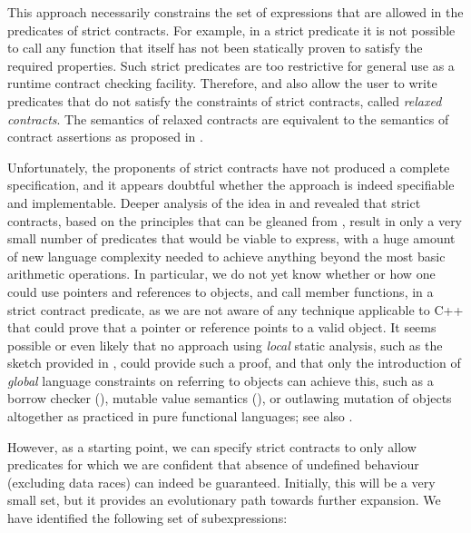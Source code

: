 This approach necessarily  constrains the set of expressions that are allowed in the predicates of strict contracts. For example, in a strict predicate it is not possible to call any function that itself has not been statically proven to satisfy the required properties. Such strict predicates are too restrictive for general use as a runtime contract checking facility. Therefore, \cite{P2680R1} and \cite{P3285R0} also allow the user to write predicates that do not satisfy the constraints of strict contracts, called \emph{relaxed contracts}. The semantics of relaxed contracts are equivalent to the semantics of contract assertions as proposed in \cite{P2900R13}.

Unfortunately, the proponents of strict contracts have not produced a complete specification, and it appears doubtful whether the approach is indeed specifiable and implementable. Deeper analysis of the idea in \cite{P3376R0} and \cite{P3386R0} revealed that strict contracts, based on the principles that can be gleaned from \cite{P3285R0}, result in only a very small number of predicates that would be viable to express, with a huge amount of new language complexity needed to achieve anything beyond the most basic arithmetic operations. In particular, we do not yet know whether or how one could use pointers and references to objects, and call member functions, in a strict contract predicate, as we are not aware of any technique applicable to C++ that could prove that a pointer or reference points to a valid object. It seems possible or even likely that no approach using \emph{local} static analysis, such as the  sketch provided in \cite{P3285R0}, could provide such a proof, and that only the introduction of \emph{global} language constraints on referring to objects can achieve this, such as a borrow checker (\cite{P3390R0}), mutable value semantics (\cite{Racordon2022}), or outlawing mutation of objects altogether as practiced in pure functional languages; see also \cite{Baxter2024}.

However, as a starting point, we can specify strict contracts to only allow predicates for which we are confident that absence of undefined behaviour (excluding data races) can indeed be guaranteed. Initially, this will be a very small set, but it provides an evolutionary path towards further expansion. We have identified the following set of subexpressions:

